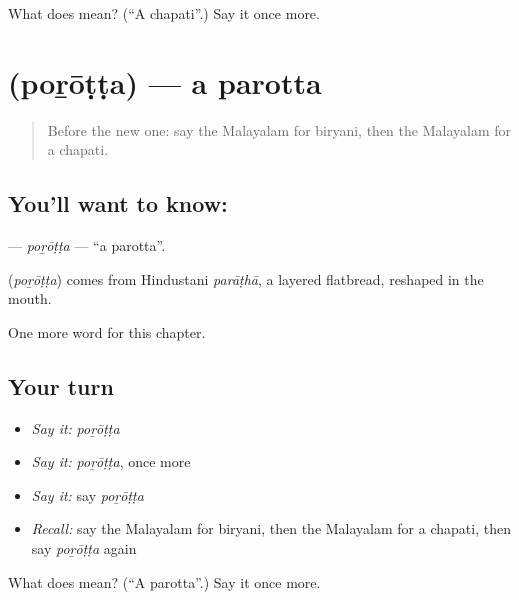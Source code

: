 \begin{tcolorbox}[breakable,colback=teal!4,colframe=teal!35!black,title={Before you move on}]
What does  mean? (\textquotedblleft{}A chapati\textquotedblright{}.) Say it once more.
\end{tcolorbox}
\section[\texorpdfstring{\ml{പൊറോട്ട} (poṟōṭṭa)}{പൊറോട്ട (poṟōṭṭa)}]{ (poṟōṭṭa) — a parotta}

\label{lesson:ML-C322-porotta}



\begin{quote}
Before the new one: say the Malayalam for biryani, then the Malayalam for a chapati.
\end{quote}

\subsection*{You'll want to know: }
\textbf{} — \emph{poṟōṭṭa} — \textquotedblleft{}a parotta\textquotedblright{}.

\begin{cousinweb}
\textbf{} (\emph{poṟōṭṭa}) comes from Hindustani \emph{parāṭhā}, a layered flatbread, reshaped in the mouth.
\end{cousinweb}

\begin{grammarlens}[title={What you've built}]
One more word for this chapter.
\end{grammarlens}

\subsection*{Your turn}
\begin{itemize}
\raggedright
  \item \emph{Say it:} \emph{poṟōṭṭa}
  \item \emph{Say it:} \emph{poṟōṭṭa}, once more
  \item \emph{Say it:} say \emph{poṟōṭṭa}
  \item \emph{Recall:} say the Malayalam for biryani, then the Malayalam for a chapati, then say \emph{poṟōṭṭa} again
\end{itemize}

\begin{tcolorbox}[breakable,colback=teal!4,colframe=teal!35!black,title={Before you move on}]
What does  mean? (\textquotedblleft{}A parotta\textquotedblright{}.) Say it once more.
\end{tcolorbox}
